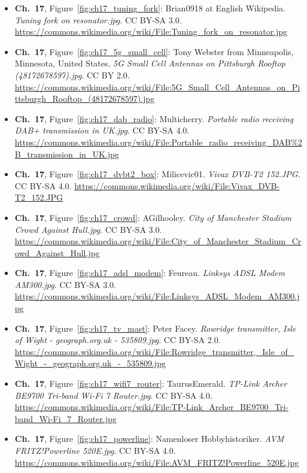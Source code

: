 \begin{small}
\begin{itemize}[leftmargin=0pt,itemsep=2pt,label={}]
\item \textbf{Ch.~17}, Figure~\ref{fig:ch17_tuning_fork}: Brian0918 at English Wikipedia. \emph{Tuning fork on resonator.\allowbreak{}jpg}. CC BY-SA 3.0. \url{https://commons.wikimedia.org/wiki/File:Tuning_fork_on_resonator.jpg}
\item \textbf{Ch.~17}, Figure~\ref{fig:ch17_5g_small_cell}: Tony Webster from Minneapolis, Minnesota, United States. \emph{5G Small Cell Antennas on Pittsburgh Rooftop (48172678597).\allowbreak{}jpg}. CC BY 2.0. \url{https://commons.wikimedia.org/wiki/File:5G_Small_Cell_Antennas_on_Pittsburgh_Rooftop_(48172678597).jpg}
\item \textbf{Ch.~17}, Figure~\ref{fig:ch17_dab_radio}: Multicherry. \emph{Portable radio receiving DAB+ transmission in UK.\allowbreak{}jpg}. CC BY-SA 4.0. \url{https://commons.wikimedia.org/wiki/File:Portable_radio_receiving_DAB%2B_transmission_in_UK.jpg}
\item \textbf{Ch.~17}, Figure~\ref{fig:ch17_dvbt2_box}: Milicevic01. \emph{Vivax DVB-\allowbreak{}T2 152.\allowbreak{}JPG}. CC BY-SA 4.0. \url{https://commons.wikimedia.org/wiki/File:Vivax_DVB-T2_152.JPG}
\item \textbf{Ch.~17}, Figure~\ref{fig:ch17_crowd}: AGilhooley. \emph{City of Manchester Stadium Crowd Against Hull.\allowbreak{}jpg}. CC BY-SA 3.0. \url{https://commons.wikimedia.org/wiki/File:City_of_Manchester_Stadium_Crowd_Against_Hull.jpg}
\item \textbf{Ch.~17}, Figure~\ref{fig:ch17_adsl_modem}: Feureau. \emph{Linksys ADSL Modem AM300.\allowbreak{}jpg}. CC BY-SA 3.0. \url{https://commons.wikimedia.org/wiki/File:Linksys_ADSL_Modem_AM300.jpg}
\item \textbf{Ch.~17}, Figure~\ref{fig:ch17_tv_mast}: Peter Facey. \emph{Rowridge transmitter, Isle of Wight -\allowbreak{} geograph.\allowbreak{}org.\allowbreak{}uk -\allowbreak{} 535809.\allowbreak{}jpg}. CC BY-SA 2.0. \url{https://commons.wikimedia.org/wiki/File:Rowridge_transmitter,_Isle_of_Wight_-_geograph.org.uk_-_535809.jpg}
\item \textbf{Ch.~17}, Figure~\ref{fig:ch17_wifi7_router}: TaurusEmerald. \emph{TP-\allowbreak{}Link Archer BE9700 Tri-\allowbreak{}band Wi-\allowbreak{}Fi 7 Router.\allowbreak{}jpg}. CC BY-SA 4.0. \url{https://commons.wikimedia.org/wiki/File:TP-Link_Archer_BE9700_Tri-band_Wi-Fi_7_Router.jpg}
\item \textbf{Ch.~17}, Figure~\ref{fig:ch17_powerline}: Namenloser Hobbyhistoriker. \emph{AVM FRITZ!Powerline 520E.\allowbreak{}jpg}. CC BY-SA 4.0. \url{https://commons.wikimedia.org/wiki/File:AVM_FRITZ!Powerline_520E.jpg}

\end{itemize}
\end{small}
